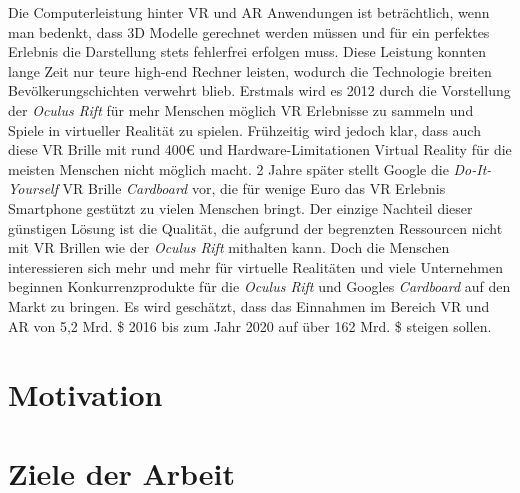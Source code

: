 Die Computerleistung hinter VR und AR Anwendungen ist beträchtlich, wenn man bedenkt, dass 3D Modelle gerechnet werden müssen und für ein perfektes Erlebnis die Darstellung stets fehlerfrei erfolgen muss. Diese Leistung konnten lange Zeit nur teure high-end Rechner leisten, wodurch die Technologie breiten Bevölkerungschichten verwehrt blieb. Erstmals wird es 2012 durch die Vorstellung der \emph{Oculus Rift} für mehr Menschen möglich VR Erlebnisse zu sammeln und Spiele in virtueller Realität zu spielen. Frühzeitig wird jedoch klar, dass auch diese VR Brille mit rund 400€ und Hardware-Limitationen Virtual Reality für die meisten Menschen nicht möglich macht. 2 Jahre später stellt Google die \emph{Do-It-Yourself} VR Brille \emph{Cardboard} vor, die für wenige Euro das VR Erlebnis Smartphone gestützt zu vielen Menschen bringt. Der einzige Nachteil dieser günstigen Lösung ist die Qualität, die aufgrund der begrenzten Ressourcen nicht mit VR Brillen wie der \emph{Oculus Rift} mithalten kann. Doch die Menschen interessieren sich mehr und mehr für virtuelle Realitäten und viele Unternehmen beginnen Konkurrenzprodukte für die \emph{Oculus Rift} und Googles \emph{Cardboard} auf den Markt zu bringen. Es wird geschätzt, dass das Einnahmen im Bereich VR und AR von 5,2 Mrd. \$ 2016 bis zum Jahr 2020 auf über 162 Mrd. \$ steigen sollen.\cite{augEco_1}
\section{Motivation} 
\section{Ziele der Arbeit}
